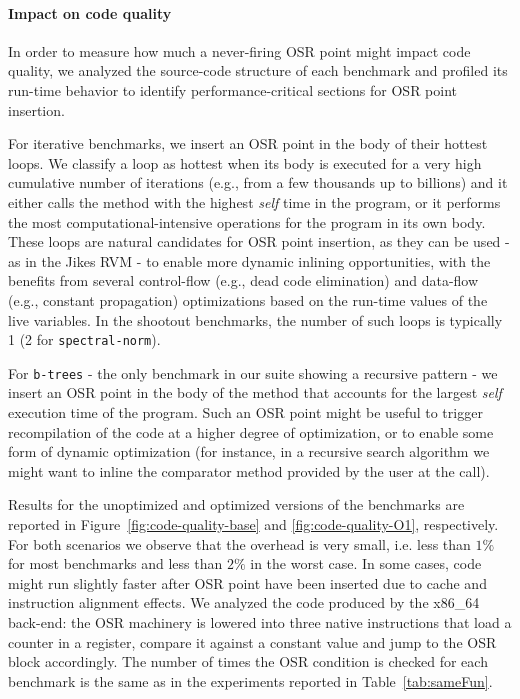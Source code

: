 \paragraph{Impact on code quality}
In order to measure how much a never-firing OSR point might impact code quality, we analyzed the source-code structure of each benchmark and profiled its run-time behavior to identify performance-critical sections for OSR point insertion.

For iterative benchmarks, we insert an OSR point in the body of their hottest loops. We classify a loop as hottest when its body is executed for a very high cumulative number of iterations (e.g., from a few thousands up to billions) and it either calls the method with the highest {\em self} time in the program, or it performs the most computational-intensive operations for the program in its own body. These loops are natural candidates for OSR point insertion, as they can be used - as in the Jikes RVM - to enable more dynamic inlining opportunities, with the benefits from several control-flow (e.g., dead code elimination) and data-flow (e.g., constant propagation) optimizations based on the run-time values of the live variables. In the shootout benchmarks, the number of such loops is typically 1 (2 for {\tt spectral-norm}).

For {\tt b-trees} - the only benchmark in our suite showing a recursive pattern - we insert an OSR point in the body of the method that accounts for the largest {\em self} execution time of the program. Such an OSR point might be useful to trigger recompilation of the code at a higher degree of optimization, or to enable some form of dynamic optimization (for instance, in a recursive search algorithm we might want to inline the comparator method provided by the user at the call).

Results for the unoptimized and optimized versions of the benchmarks are reported in Figure~\ref{fig:code-quality-base} and \ref{fig:code-quality-O1}, respectively. For both scenarios we observe that the overhead is very small, i.e. less than $1\%$ for most benchmarks and less than $2\%$ in the worst case. In some cases, code might run slightly faster after OSR point have been inserted due to cache and instruction alignment effects. We analyzed the code produced by the x86_64 back-end: the OSR machinery is lowered into three native instructions that load a counter in a register, compare it against a constant value and jump to the OSR block accordingly. The number of times the OSR condition is checked for each benchmark is the same as in the experiments reported in Table~\ref{tab:sameFun}.
  
